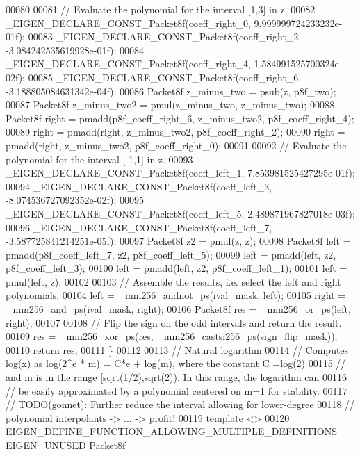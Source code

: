 \begin{DoxyCode}
00080 
00081   \textcolor{comment}{// Evaluate the polynomial for the interval [1,3] in z.}
00082   \_EIGEN\_DECLARE\_CONST\_Packet8f(coeff\_right\_0, 9.999999724233232e-01f);
00083   \_EIGEN\_DECLARE\_CONST\_Packet8f(coeff\_right\_2, -3.084242535619928e-01f);
00084   \_EIGEN\_DECLARE\_CONST\_Packet8f(coeff\_right\_4, 1.584991525700324e-02f);
00085   \_EIGEN\_DECLARE\_CONST\_Packet8f(coeff\_right\_6, -3.188805084631342e-04f);
00086   Packet8f z\_minus\_two = psub(z, p8f\_two);
00087   Packet8f z\_minus\_two2 = pmul(z\_minus\_two, z\_minus\_two);
00088   Packet8f right = pmadd(p8f\_coeff\_right\_6, z\_minus\_two2, p8f\_coeff\_right\_4);
00089   right = pmadd(right, z\_minus\_two2, p8f\_coeff\_right\_2);
00090   right = pmadd(right, z\_minus\_two2, p8f\_coeff\_right\_0);
00091 
00092   \textcolor{comment}{// Evaluate the polynomial for the interval [-1,1] in z.}
00093   \_EIGEN\_DECLARE\_CONST\_Packet8f(coeff\_left\_1, 7.853981525427295e-01f);
00094   \_EIGEN\_DECLARE\_CONST\_Packet8f(coeff\_left\_3, -8.074536727092352e-02f);
00095   \_EIGEN\_DECLARE\_CONST\_Packet8f(coeff\_left\_5, 2.489871967827018e-03f);
00096   \_EIGEN\_DECLARE\_CONST\_Packet8f(coeff\_left\_7, -3.587725841214251e-05f);
00097   Packet8f z2 = pmul(z, z);
00098   Packet8f left = pmadd(p8f\_coeff\_left\_7, z2, p8f\_coeff\_left\_5);
00099   left = pmadd(left, z2, p8f\_coeff\_left\_3);
00100   left = pmadd(left, z2, p8f\_coeff\_left\_1);
00101   left = pmul(left, z);
00102 
00103   \textcolor{comment}{// Assemble the results, i.e. select the left and right polynomials.}
00104   left = \_mm256\_andnot\_ps(ival\_mask, left);
00105   right = \_mm256\_and\_ps(ival\_mask, right);
00106   Packet8f res = \_mm256\_or\_ps(left, right);
00107 
00108   \textcolor{comment}{// Flip the sign on the odd intervals and return the result.}
00109   res = \_mm256\_xor\_ps(res, \_mm256\_castsi256\_ps(sign\_flip\_mask));
00110   \textcolor{keywordflow}{return} res;
00111 \}
00112 
00113 \textcolor{comment}{// Natural logarithm}
00114 \textcolor{comment}{// Computes log(x) as log(2^e * m) = C*e + log(m), where the constant C =log(2)}
00115 \textcolor{comment}{// and m is in the range [sqrt(1/2),sqrt(2)). In this range, the logarithm can}
00116 \textcolor{comment}{// be easily approximated by a polynomial centered on m=1 for stability.}
00117 \textcolor{comment}{// TODO(gonnet): Further reduce the interval allowing for lower-degree}
00118 \textcolor{comment}{//               polynomial interpolants -> ... -> profit!}
00119 \textcolor{keyword}{template} <>
00120 EIGEN\_DEFINE\_FUNCTION\_ALLOWING\_MULTIPLE\_DEFINITIONS EIGEN\_UNUSED Packet8f

\end{DoxyCode}
